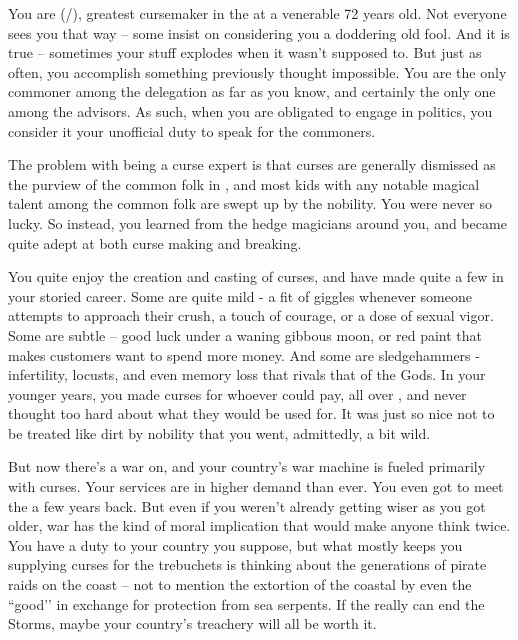 \documentclass[char]{GL2020}
\begin{document}
\name{\cCurse{}}

You are \cCurse{} (\cCurse{\they}/\cCurse{\them}), greatest cursemaker in the \pFarm{} at a venerable 72 years old. Not everyone sees you that way -- some insist on considering you a doddering old fool. And it is true -- sometimes your stuff explodes when it wasn’t supposed to. But just as often, you accomplish something previously thought impossible. You are the only commoner among the \pFarm{} delegation as far as you know, and certainly the only one among the advisors. As such, when you are obligated to engage in politics, you consider it your unofficial duty to speak for the commoners.

The problem with being a curse expert is that curses are generally dismissed as the purview of the common folk in \pFarm{}, and most kids with any notable magical talent among the common folk are swept up by the nobility. You were never so lucky. So instead, you learned from the hedge magicians around you, and became quite adept at both curse making and breaking. 

You quite enjoy the creation and casting of curses, and have made quite a few in your storied career. Some are quite mild - a fit of giggles whenever someone attempts to approach their crush, a touch of courage, or a dose of sexual vigor. Some are subtle -- good luck under a waning gibbous moon, or red paint that makes customers want to spend more money. And some are sledgehammers - infertility, locusts, and even memory loss that rivals that of the Gods. In your younger years, you made curses for whoever could pay, all over \pEarth{}, and never thought too hard about what they would be used for. It was just so nice not to be treated like dirt by \pFarm{} nobility that you went, admittedly, a bit wild.

But now there’s a war on, and your country’s war machine is fueled primarily with curses. Your services are in higher demand than ever. You even got to meet the \cQueen{\Majesty} a few years back. But even if you weren't already getting wiser as you got older, war has the kind of moral implication that would make anyone think twice. You have a duty to your country you suppose, but what mostly keeps you supplying curses for the trebuchets is thinking about the generations of pirate raids on the coast -- not to mention the extortion of the coastal \pFarm{} by even the ``good’’ \pShippies{} in exchange for protection from sea serpents. If the \pTech{} really can end the Storms, maybe your country’s treachery will all be worth it.
\end{document}
